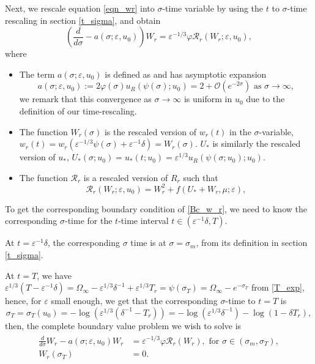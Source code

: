 \documentclass[letterpaper,11pt]{article}
\newcommand{\Ral}{\mathcal{R}}
\newcommand{\rmO}{\mathcal{O}}
\newcommand{\eps}{\varepsilon}
\numberwithin{equation}{section}
\theoremstyle{plain}
\begin{document}
Next, we rescale equation \eqref{eqn_wr} into $\sigma$-time variable by using the $t$ to $\sigma$-time rescaling in section \ref{t_sigma}, and obtain
\begin{equation}\label{rescl_wr}
\left(\frac{d}{d\sigma} - a(\sigma; \eps, u_0)\right) W_r =\eps^{-1/3}\varphi \mathcal{R}_r(W_r; \eps,u_0),
\end{equation}
where
\begin{itemize}
\item The term $a(\sigma;\eps, u_0)$ is defined as and has asymptotic expansion
\[
a(\sigma; \eps, u_0) := 2\varphi(\sigma)u_R(\psi(\sigma); u_0) =  2+\rmO(e^{-2\sigma}) \text{ as }\sigma \to \infty,
\]
we remark that this convergence as $\sigma \to \infty$ is uniform in $u_0$ due to the definition of our time-rescaling.

\item The function $W_r(\sigma)$ is the rescaled version of $w_r(t)$ in the $\sigma$-variable, $w_r(t) = w_r(\eps^{-1/3}\psi(\sigma)+\eps^{-1}\delta) = W_r(\sigma)$. $U_*$ is similarly the rescaled version of $u_*$,  $U_*(\sigma;u_0)= u_*(t;u_0) = \eps^{1/3}u_R(\psi(\sigma;u_0);u_0)$.

\item The function $\Ral_r$ is a rescaled version of $R_r$ such that 
\[
\mathcal{R}_r(W_r;\eps,u_0) = W_r^2 + f(U_*+W_r, \mu ; \eps),
\]
\end{itemize}
 

To get the corresponding boundary condition of \ref{Bc_w_r}, we need to know the corresponding $\sigma$-time for the $t$-time interval $t\in (\eps^{-1}\delta, T)$.

At $t = \eps^{-1}\delta$, the corresponding $\sigma$ time is at $\sigma=\sigma_m$, from its definition in section \ref{t_sigma}.

At $t=T$, we have $\eps^{1/3}(T-\eps^{-1}\delta) = \Omega_\infty -\eps^{1/3}\delta^{-1}+\eps^{1/3}T_r=\psi(\sigma_T) = \Omega_\infty-e^{-\sigma_T}$ from \eqref{T_exp}, hence, for $\eps$ small enough, we get that the corresponding $\sigma$-time to $t=T$ is 
\begin{equation}\label{def_sigm_T}
\sigma_T=\sigma_T(u_0)= -\log(\eps^{1/3}(\delta^{-1}-T_r)) = -\log(\eps^{1/3}\delta^{-1}) - \log(1-\delta T_r),
\end{equation}
then, the complete boundary value problem we wish to solve is
\begin{align}\label{wr_bp}
\begin{split}
\frac{d}{d\sigma} W_r - a(\sigma;\eps,u_0)W_r &= \eps^{-1/3}\varphi \Ral_r(W_r), \text{ for } \sigma \in (\sigma_m, \sigma_T),\\
W_r(\sigma_T) &= 0.
\end{split}
\end{align}
\end{document}

